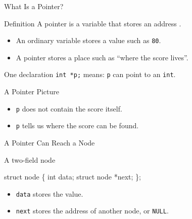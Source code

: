 \documentclass[aspectratio=169]{beamer}
\begin{document}
\begin{frame}{What Is a Pointer?}
  \begin{block}{Definition}
    A pointer is a variable that stores an address
    \cite{Wirth2004_algorithms_data_structures}.
  \end{block}
  \begin{itemize}
    \item An ordinary variable stores a value such as \texttt{80}.
    \item A pointer stores a place such as ``where the score lives''.
  \end{itemize}
  \begin{exampleblock}{One declaration}
    \texttt{int *p;} means: \texttt{p} can point to an \texttt{int}.
  \end{exampleblock}
\end{frame}

\begin{frame}{A Pointer Picture}
  \begin{center}
  \end{center}
  \begin{itemize}
    \item \texttt{p} does not contain the score itself.
    \item \texttt{p} tells us where the score can be found.
  \end{itemize}
\end{frame}

\begin{frame}[fragile]{A Pointer Can Reach a Node}
  \begin{block}{A two-field node}
\begin{semiverbatim}
struct node \{
  int data;
  struct node *next;
\};
\end{semiverbatim}
  \end{block}
  \begin{itemize}
    \item \texttt{data} stores the value.
    \item \texttt{next} stores the address of another node, or \texttt{NULL}.
  \end{itemize}
\end{frame}
\end{document}
